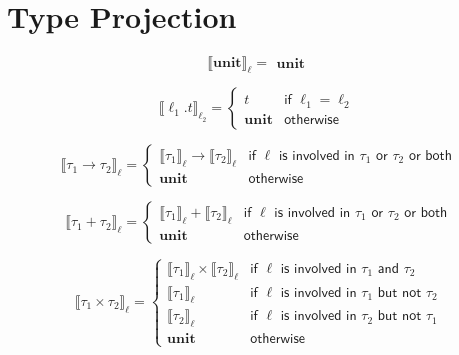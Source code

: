 \documentclass{article}
\begin{document}
\section{Type Projection} 
$$
 \llbracket  \textbf{unit} \rrbracket _\ell =
    \begin{array}{ll}
    \textbf{unit}
    \end{array}
$$

$$
 \llbracket  \ell_1 . t \rrbracket _{\ell_2} = \left\{
    \begin{array}{ll}
    t & \textsf{if } \ell_1 = \ell_2 \\
    \textbf{unit} & \textsf{otherwise}
    \end{array}
\right.
$$

$$
 \llbracket  \tau_1 \to \tau_2 \rrbracket _\ell = \left\{
    \begin{array}{ll}
    \llbracket  \tau_1 \rrbracket _\ell \to \llbracket  \tau_2 \rrbracket _\ell & \textsf{if } \ell \textsf{ is involved in } \tau_1 \textsf{ or } \tau_2 \textsf{ or both}\\
    \textbf{unit} & \textsf{otherwise}
    \end{array}
\right.
$$

$$
 \llbracket  \tau_1 + \tau_2 \rrbracket _\ell = \left\{
    \begin{array}{ll}
    \llbracket  \tau_1 \rrbracket_\ell + \llbracket  \tau_2 \rrbracket _\ell & \textsf{if } \ell \textsf{ is involved in } \tau_1 \textsf{ or } \tau_2 \textsf{ or both}\\
    \textbf{unit} & \textsf{otherwise}
    \end{array}
\right.
$$

$$
 \llbracket  \tau_1 \times \tau_2 \rrbracket _\ell = \left\{
    \begin{array}{ll}
    \llbracket  \tau_1 \rrbracket_\ell \times \llbracket  \tau_2 \rrbracket _\ell & \textsf{if } \ell \textsf{ is involved in } \tau_1 \textsf{ and } \tau_2 \\
    \llbracket  \tau_1 \rrbracket_\ell & \textsf{if } \ell \textsf{ is involved in } \tau_1 \textsf{ but not } \tau_2 \\
    \llbracket  \tau_2 \rrbracket_\ell & \textsf{if } \ell \textsf{ is involved in } \tau_2 \textsf{ but not } \tau_1 \\
    \textbf{unit} & \textsf{otherwise}
    \end{array}
\right.
$$
\end{document}
